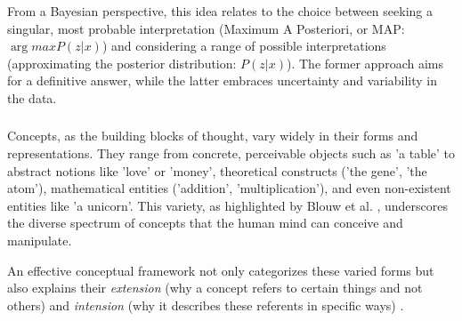 
From a Bayesian perspective, this idea relates to the choice between seeking a singular, most probable interpretation (Maximum A Posteriori, or MAP: $\arg max P(z|x)$) and considering a range of possible interpretations (approximating the posterior distribution: $P(z|x)$). The former approach aims for a definitive answer, while the latter embraces uncertainty and variability in the data.



\subsubsection{}
Concepts, as the building blocks of thought, vary widely in their forms and representations. They range from concrete, perceivable objects such as 'a table' to abstract notions like 'love' or 'money', theoretical constructs ('the gene', 'the atom'), mathematical entities ('addition', 'multiplication'), and even non-existent entities like 'a unicorn'. This variety, as highlighted by Blouw et al. \cite{blouw2016concepts}, underscores the diverse spectrum of concepts that the human mind can conceive and manipulate.

An effective conceptual framework not only categorizes these varied forms but also explains their \emph{extension} (why a concept refers to certain things and not others) and \emph{intension} (why it describes these referents in specific ways) \cite{ball2013surfaces}. 

